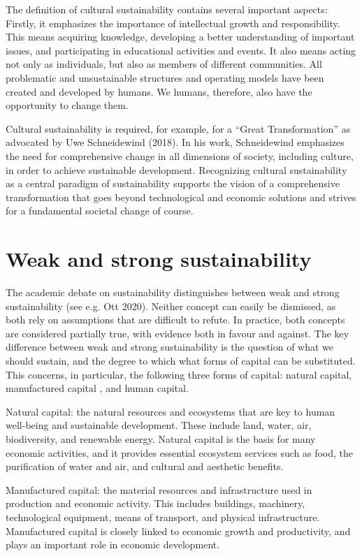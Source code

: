 \documentclass[
  a4paper,
  openany]{book}
\begin{document}
The definition of cultural sustainability contains several important
aspects: Firstly, it emphasizes the importance of intellectual growth
and responsibility. This means acquiring knowledge, developing a better
understanding of important issues, and participating in educational
activities and events. It also means acting not only as individuals, but
also as members of different communities. All problematic and
unsustainable structures and operating models have been created and
developed by humans. We humans, therefore, also have the opportunity to
change them.

Cultural sustainability is required, for example, for a ``Great
Transformation'' as advocated by Uwe Schneidewind (2018). In his work,
Schneidewind emphasizes the need for comprehensive change in all
dimensions of society, including culture, in order to achieve
sustainable development. Recognizing cultural sustainability as a
central paradigm of sustainability supports the vision of a
comprehensive transformation that goes beyond technological and economic
solutions and strives for a fundamental societal change of course.

\section{Weak and strong
sustainability}\label{weak-and-strong-sustainability}

The academic debate on sustainability distinguishes between weak and
strong sustainability (see e.g. Ott 2020). Neither concept can easily be
dismissed, as both rely on assumptions that are difficult to refute. In
practice, both concepts are considered partially true, with evidence
both in favour and against. The key difference between weak and strong
sustainability is the question of what we should sustain, and the degree
to which what forms of capital can be substituted. This concerns, in
particular, the following three forms of capital: natural capital,
manufactured capital , and human capital.

Natural capital: the natural resources and ecosystems that are key to
human well-being and sustainable development. These include land, water,
air, biodiversity, and renewable energy. Natural capital is the basis
for many economic activities, and it provides essential ecosystem
services such as food, the purification of water and air, and cultural
and aesthetic benefits.

Manufactured capital: the material resources and infrastructure used in
production and economic activity. This includes buildings, machinery,
technological equipment, means of transport, and physical
infrastructure. Manufactured capital is closely linked to economic
growth and productivity, and plays an important role in economic
development.
\end{document}

